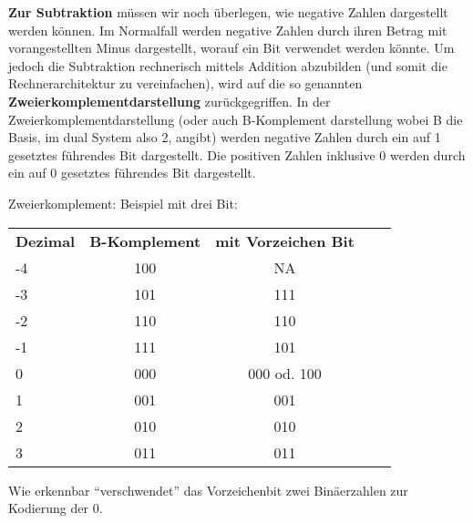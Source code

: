 \begin{bsslide}[\textbufferB]
  \textbf{Zur Subtraktion} m\"ussen wir noch \"uberlegen, wie negative Zahlen dargestellt werden k\"onnen. Im Normalfall werden negative Zahlen durch ihren Betrag mit vorangestellten Minus dargestellt, worauf ein Bit verwendet werden k\"onnte. Um jedoch die Subtraktion rechnerisch mittels Addition abzubilden (und somit die Rechnerarchitektur zu vereinfachen), wird auf die so genannten \textbf{Zweierkomplementdarstellung} zur\"uckgegriffen. 
  In der Zweierkomplementdarstellung (oder auch B-Komplement
  darstellung wobei B die Basis, im dual System also 2, angibt) werden negative Zahlen durch ein auf 1 gesetztes f\"uhrendes Bit dargestellt. Die positiven Zahlen inklusive $0$ werden durch ein auf $0$ gesetztes f\"uhrendes Bit dargestellt. 
\end{bsslide}

\begin{bsslide}[\textbufferB]
  Zweierkomplement: Beispiel mit drei Bit:
  \begin{center}
    \begin{tabular}{lcccc}
      \textbf{Dezimal}   &   \textbf{B-Komplement}     & \textbf{mit Vorzeichen Bit}  \\
      -4  &     100  &   NA       \\
      -3  &     101  &    111      \\
      -2  &     110  &    110       \\
      -1  &     111  &    101       \\
      0 &     000  &    000 od. 100      \\
      1 &     001  &    001       \\
      2 &     010  &    010      \\
      3 &     011  &    011  \\
      \hline
    \end{tabular}
  \end{center}
  Wie erkennbar ``verschwendet'' das Vorzeichenbit zwei Bin\"aerzahlen zur Kodierung der 0.
\end{bsslide}

